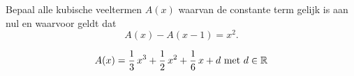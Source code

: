 \documentclass{ximera}
\begin{document}
	\author{Koen De Naeghel - Wiskunde Op Maat}
    \xmsource
	\label{xim:veeltermen_toepassingen_oefeningen_reeks3}

\begin{exercise}
Bepaal alle kubische veeltermen $A(x)$ waarvan de constante term gelijk is aan nul en waarvoor geldt dat
\[
A(x) - A(x-1) = x^2.
\]

\begin{uitkomst}
$$
A(x) = \frac{1}{3}\,x^3 + \frac{1}{2}\,x^2 + \frac{1}{6}\,x + d \text{ met } d \in \mathbb{R} 
$$
\end{uitkomst}
\end{exercise}
\end{document}
